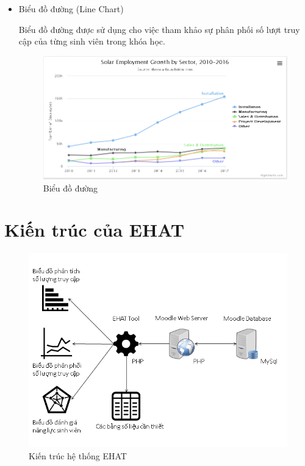 \begin{itemize}
	\item Biểu đồ đường (Line Chart)
	
	Biểu đồ đường được sử dụng cho việc tham khảo sự phân phối số lượt truy cập của từng sinh viên trong khóa học.
	
	\begin{center}
		\begin{figure}[htp]
			\begin{center}
				\includegraphics[scale=0.7]{img/line}
			\end{center}
			\caption{Biểu đồ đường}
			\label{refhinh18}
		\end{figure}
	\end{center}
	
\end{itemize}

\newpage
\section{Kiến trúc của EHAT}

\begin{center}
	\begin{figure}[htp]
		\begin{center}
			\includegraphics[scale=1]{img/kientrucehat}
		\end{center}
		\caption{Kiến trúc hệ thống EHAT}
		\label{refhinh21}
	\end{figure}
\end{center}